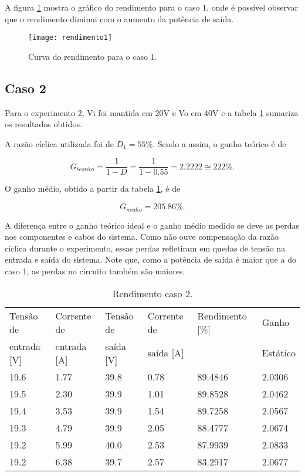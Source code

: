 	A figura \ref{f_rend1} mostra o gráfico do rendimento para o caso 1, onde é possível observar que o rendimento diminui com o aumento da potência de saída.
	
	\begin{figure}[H]
		\centering
		\caption{Curva do rendimento para o caso 1.}
		\texttt{[image: rendimento1]}
		\label{f_rend1}
	\end{figure}
	
\subsection{Caso 2}

	Para o experimento 2, Vi foi mantida em 20V e Vo em 40V e a tabela \ref{t_rend2} sumariza os resultados obtidos.
	
	A razão cíclica utilizada foi de $D_1 = 55 \%$. Sendo a assim, o ganho teórico é de
	
	\[
	G_{teorico} = \frac{1}{1-D} = \frac{1}{1-0.55} = 2.2222 \cong 222 \%.
	\]
	
	O ganho médio, obtido a partir da tabela \ref{t_rend2}, é de
	
	\[
	G_{medio} = 205.86 \%.
	\]
	
	A diferença entre o ganho teórico ideal e o ganho médio medido se deve as perdas nos componentes e cabos do sistema. Como não ouve compensação da razão cíclica durante o experimento, essas perdas refletiram em quedas de tensão na entrada e saída do sistema. Note que, como a potência de saída é maior que a do caso 1, as perdas no circuito também são maiores.
	
	\begin{small}
		\begin{table}[H]
			\begin{center}
				\caption{Rendimento caso 2.}
				\begin{tabular}{l|l|l|l|l|l}
					\hline
					Tensão de   &  Corrente de 	& Tensão de & Corrente de	& Rendimento [\%] 	& Ganho    	\\
					entrada [V] &  entrada [A] 	& saída [V] & saída [A]  	&                 	& Estático 	\\
					\hline
					19.6 		& 1.77			& 39.8		& 0.78			& 89.4846			& 2.0306	\\
					\hline
					19.5		& 2.30			& 39.9		& 1.01			& 89.8528			& 2.0462	\\
					\hline
					19.4		& 3.53			& 39.9		& 1.54			& 89.7258			& 2.0567	\\
					\hline
					19.3		& 4.79			& 39.9		& 2.05			& 88.4777			& 2.0674	\\
					\hline
					19.2		& 5.99			& 40.0		& 2.53			& 87.9939			& 2.0833	\\
					\hline
					19.2		& 6.38			& 39.7		& 2.57			& 83.2917			& 2.0677	\\
				\end{tabular}
				\label{t_rend2}
			\end{center}
		\end{table}
	\end{small}
	

